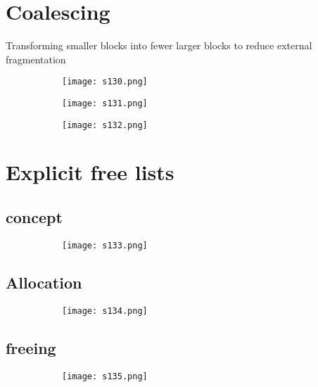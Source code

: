 \documentclass[8pt]{extreport}
\begin{document}
\section{Coalescing}

Transforming smaller blocks into fewer larger blocks to reduce external fragmentation
\begin{figure}[H]
\centering
\begin{subfigure}[b]{0.4\linewidth}
\texttt{[image: s130.png]}
\end{subfigure}
\begin{subfigure}[b]{0.4\linewidth}
\texttt{[image: s131.png]}
\end{subfigure}
\begin{subfigure}[b]{0.4\linewidth}
\texttt{[image: s132.png]}
\end{subfigure}
\end{figure}

\section{Explicit free lists}

\subsection{concept}
\begin{figure}[H]
\centering
\begin{subfigure}[b]{0.4\linewidth}
\texttt{[image: s133.png]}
\end{subfigure}
\end{figure}
\subsection{Allocation}
\begin{figure}[H]
\centering
\begin{subfigure}[b]{0.4\linewidth}
\texttt{[image: s134.png]}
\end{subfigure}
\end{figure}
\subsection{freeing}
\begin{figure}[H]
\centering
\begin{subfigure}[b]{0.4\linewidth}
\texttt{[image: s135.png]}
\end{subfigure}
\end{figure}
\end{document}
